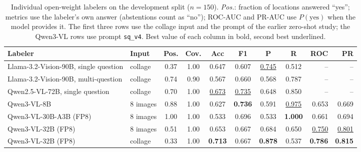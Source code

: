 \begin{table}[t]
\centering
\footnotesize
\setlength{\tabcolsep}{3pt}
\caption{Individual open-weight labelers on the development split ($n=150$). \emph{Pos.}: fraction of locations answered ``yes''; metrics use the labeler's own answer (abstentions count as ``no''); ROC-AUC and PR-AUC use $P(\mathrm{yes})$ when the model provides it. The first three rows use the collage input and the prompt of the earlier zero-shot study; the Qwen3-VL rows use prompt \texttt{sq\_v4}. Best value of each column in bold, second best underlined.}
\label{tab:labelers}
\begin{tabular}{llccccccrr}
\toprule
Labeler & Input & Pos. & Cov. & Acc & F1 & P & R & ROC & PR \\
\midrule
Llama-3.2-Vision-90B, single question & collage & 0.37 & 1.00 & 0.647 & 0.607 & \underline{0.745} & 0.512 & -- & --  \\
Llama-3.2-Vision-90B, multi-question & collage & 0.74 & 0.90 & 0.567 & 0.660 & 0.568 & 0.787 & -- & --  \\
Qwen2.5-VL-72B, single question & collage & 0.70 & 1.00 & \underline{0.673} & \underline{0.735} & 0.648 & 0.850 & -- & --  \\
Qwen3-VL-8B & 8 images & 0.88 & 1.00 & 0.627 & \textbf{0.736} & 0.591 & \underline{0.975} & 0.653 & 0.669  \\
Qwen3-VL-30B-A3B (FP8) & 8 images & 1.00 & 1.00 & 0.533 & 0.696 & 0.533 & \textbf{1.000} & 0.661 & 0.694  \\
Qwen3-VL-32B (FP8) & 8 images & 0.51 & 1.00 & 0.653 & 0.667 & 0.684 & 0.650 & \underline{0.750} & \underline{0.801} \\
Qwen3-VL-32B (FP8) & collage & 0.33 & 1.00 & \textbf{0.713} & 0.667 & \textbf{0.878} & 0.537 & \textbf{0.786} & \textbf{0.815} \\
\bottomrule
\end{tabular}
\end{table}

